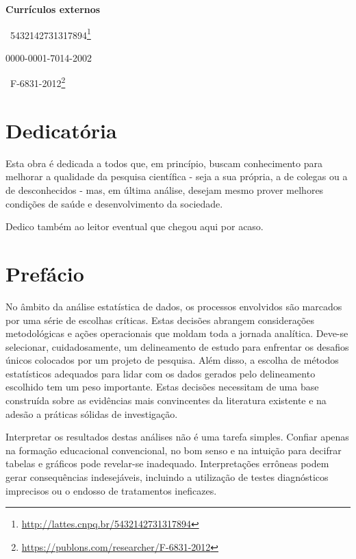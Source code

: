 \documentclass[
]{book}
\renewcommand{\href}[2]{#2\footnote{\url{#1}}}
\begin{document}
\textbf{Currículos externos}

\href{http://lattes.cnpq.br/5432142731317894}{~5432142731317894}

0000-0001-7014-2002

\href{https://publons.com/researcher/F-6831-2012}{~F-6831-2012}

\hypertarget{dedicatuxf3ria}{%
\chapter*{Dedicatória}\label{dedicatuxf3ria}}

\markboth{}{}

Esta obra é dedicada a todos que, em princípio, buscam conhecimento para melhorar a qualidade da pesquisa científica - seja a sua própria, a de colegas ou a de desconhecidos - mas, em última análise, desejam mesmo prover melhores condições de saúde e desenvolvimento da sociedade.

Dedico também ao leitor eventual que chegou aqui por acaso.

\hypertarget{prefuxe1cio}{%
\chapter*{Prefácio}\label{prefuxe1cio}}

\markboth{}{}

No âmbito da análise estatística de dados, os processos envolvidos são marcados por uma série de escolhas críticas. Estas decisões abrangem considerações metodológicas e ações operacionais que moldam toda a jornada analítica. Deve-se selecionar, cuidadosamente, um delineamento de estudo para enfrentar os desafios únicos colocados por um projeto de pesquisa. Além disso, a escolha de métodos estatísticos adequados para lidar com os dados gerados pelo delineamento escolhido tem um peso importante. Estas decisões necessitam de uma base construída sobre as evidências mais convincentes da literatura existente e na adesão a práticas sólidas de investigação.

Interpretar os resultados destas análises não é uma tarefa simples. Confiar apenas na formação educacional convencional, no bom senso e na intuição para decifrar tabelas e gráficos pode revelar-se inadequado. Interpretações errôneas podem gerar consequências indesejáveis, incluindo a utilização de testes diagnósticos imprecisos ou o endosso de tratamentos ineficazes.
\end{document}
